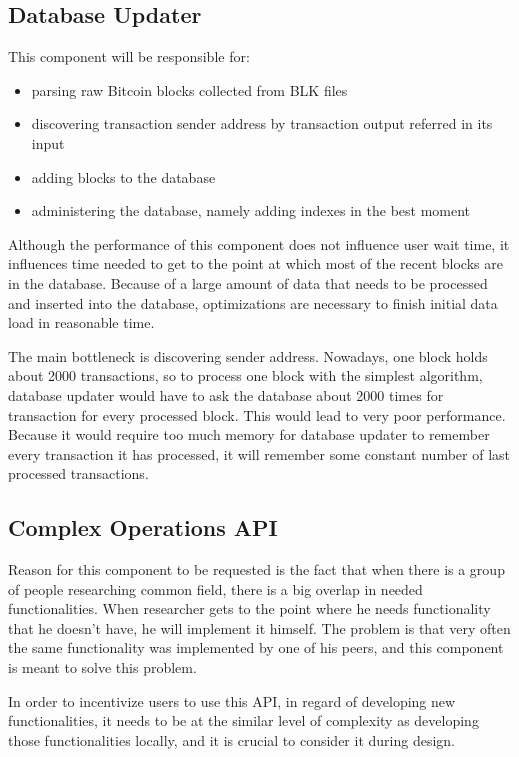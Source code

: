 \documentclass[12pt, en, eng, twoside, final]{mgr}
\begin{document}
\subsection{Database Updater}
This component will be responsible for:

\begin{itemize}
\item
parsing raw Bitcoin blocks collected from BLK files
\item
discovering transaction sender address by transaction output referred in its input
\item
adding blocks to the database
\item
administering the database, namely adding indexes in the best moment
\end{itemize}

Although the performance of this component does not influence user wait time, it influences time needed to get to the point at which most of the recent blocks are in the database. Because of a large amount of data that needs to be processed and inserted into the database, optimizations are necessary to finish initial data load in reasonable time.

The main bottleneck is discovering sender address. Nowadays, one block holds about 2000 transactions, so to process one block with the simplest algorithm, database updater would have to ask the database about 2000 times for transaction for every processed block. This would lead to very poor performance. Because it would require too much memory for database updater to remember every transaction it has processed, it will remember some constant number of last processed transactions.

\subsection{Complex Operations API}
Reason for this component to be requested is the fact that when there is a group of people researching common field, there is a big overlap in needed functionalities. When researcher gets to the point where he needs functionality that he doesn't have, he will implement it himself. The problem is that very often the same functionality was implemented by one of his peers, and this component is meant to solve this problem. 

In order to incentivize users to use this API, in regard of developing new functionalities, it needs to be at the similar level of complexity as developing those functionalities locally, and it is crucial to consider it during design.
\end{document}
